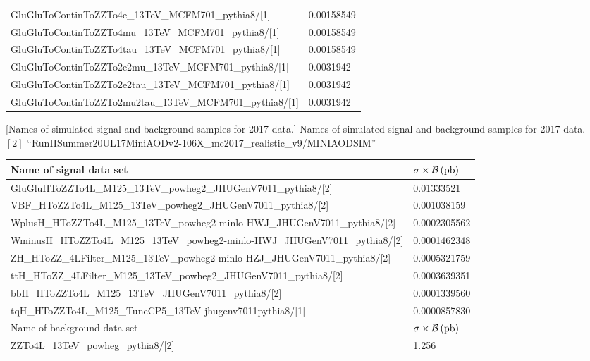 \begin{table}[h]
\begin{tabular}{|ll|}
		GluGluToContinToZZTo4e\_13TeV\_MCFM701\_pythia8/[1]	&	0.00158549	\\
		GluGluToContinToZZTo4mu\_13TeV\_MCFM701\_pythia8/[1]	&	0.00158549	\\
		GluGluToContinToZZTo4tau\_13TeV\_MCFM701\_pythia8/[1]	&	0.00158549	\\
		GluGluToContinToZZTo2e2mu\_13TeV\_MCFM701\_pythia8/[1]	&	0.0031942	\\
		GluGluToContinToZZTo2e2tau\_13TeV\_MCFM701\_pythia8/[1]	&	0.0031942	\\
		GluGluToContinToZZTo2mu2tau\_13TeV\_MCFM701\_pythia8/[1]	&	0.0031942	\\
        \hline
        \end{tabular}
    \label{table:dilep_2016_simSamples}
\end{table}
\begin{table}[h]
    \small
        [Names of simulated signal and background samples for 2017 data.] %
        {Names of simulated signal and background samples for 2017 data. \\ %
        $[2]$ ``RunIISummer20UL17MiniAODv2-106X\_mc2017\_realistic\_v9/MINIAODSIM''}
	\begin{tabular}{|ll|}
		\hline      
        Name of signal data set & $\sigma \times \mathcal{B}\,(\text{pb})$ \\
        \hline
		GluGluHToZZTo4L\_M125\_13TeV\_powheg2\_JHUGenV7011\_pythia8/[2]	&	0.01333521	\\
		VBF\_HToZZTo4L\_M125\_13TeV\_powheg2\_JHUGenV7011\_pythia8/[2]	&	0.001038159	\\
		WplusH\_HToZZTo4L\_M125\_13TeV\_powheg2-minlo-HWJ\_JHUGenV7011\_pythia8/[2]	&	0.0002305562	\\
		WminusH\_HToZZTo4L\_M125\_13TeV\_powheg2-minlo-HWJ\_JHUGenV7011\_pythia8/[2]	&	0.0001462348	\\
		ZH\_HToZZ\_4LFilter\_M125\_13TeV\_powheg2-minlo-HZJ\_JHUGenV7011\_pythia8/[2]	&	0.0005321759	\\
		ttH\_HToZZ\_4LFilter\_M125\_13TeV\_powheg2\_JHUGenV7011\_pythia8/[2]	&	0.0003639351	\\
		bbH\_HToZZTo4L\_M125\_13TeV\_JHUGenV7011\_pythia8/[2]	&	0.0001339560	\\
		tqH\_HToZZTo4L\_M125\_TuneCP5\_13TeV-jhugenv7011\-pythia8/[1]	&	0.0000857830	\\
		\hline	
		\hline	
        Name of background data set & $\sigma \times \mathcal{B}\,(\text{pb})$ \\
		\hline	
		ZZTo4L\_13TeV\_powheg\_pythia8/[2]	&	1.256	\\

\end{tabular}
\end{table}
